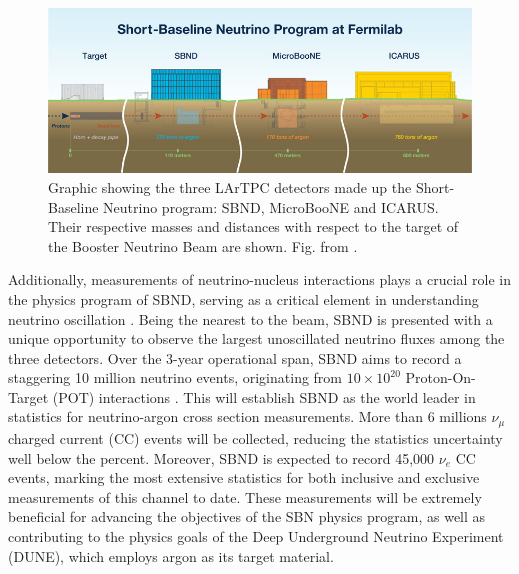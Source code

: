 \begin{figure}[htbp] 
\centering    
\includegraphics[width=1.0\textwidth]{SBN_program}
\caption[SBN_program]{
Graphic showing the three LArTPC detectors made up the Short-Baseline Neutrino program: SBND, MicroBooNE and ICARUS.
Their respective masses and distances with respect to the target of the Booster Neutrino Beam are shown.
Fig. from \cite{SBNProgram}.
}
\label{fig:SBN_program}
\end{figure}

Additionally, measurements of neutrino-nucleus interactions plays a crucial role in the physics program of SBND, serving as a critical element in understanding neutrino oscillation \cite{NuSTECWhitePaper}. 
Being the nearest to the beam, SBND is presented with a unique opportunity to observe the largest unoscillated neutrino fluxes among the three detectors.
Over the 3-year operational span, SBND aims to record a staggering 10 million neutrino events, originating from $10 \times 10^{20}$ Proton-On-Target (POT) interactions \cite{SBNProgram}.
This will establish SBND as the world leader in statistics for neutrino-argon cross section measurements.
More than 6 millions $\nu_{\mu}$ charged current (CC) events will be collected, reducing the statistics uncertainty well below the percent.
Moreover, SBND is expected to record 45,000 $\nu_{e}$ CC events, marking the most extensive statistics for both inclusive and exclusive measurements of this channel to date.
These measurements will be extremely beneficial for advancing the objectives of the SBN physics program, as well as contributing to the physics goals of the Deep Underground Neutrino Experiment (DUNE), which employs argon as its target material.

